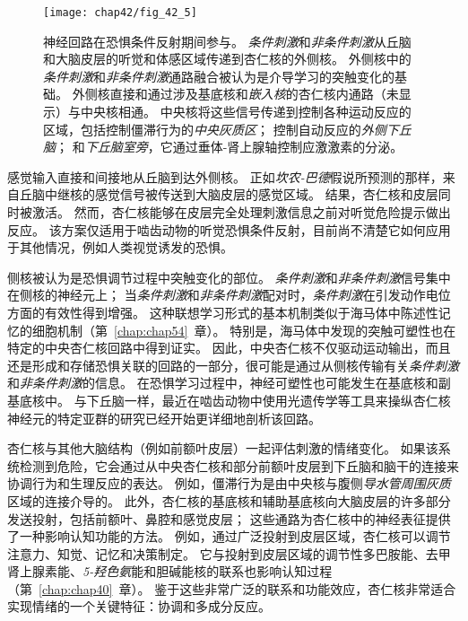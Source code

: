 \begin{figure}[htbp]
	\centering
	\texttt{[image: chap42/fig\_42\_5]}
	\caption{神经回路在恐惧条件反射期间参与。
		\textit{条件刺激}和\textit{\textit{非条件刺激}}从丘脑和大脑皮层的听觉和体感区域传递到杏仁核的外侧核。
		外侧核中的\textit{条件刺激}和\textit{非条件刺激}通路融合被认为是介导学习的突触变化的基础。
		外侧核直接和通过涉及基底核和\textit{嵌入核}的杏仁核内通路（未显示）与中央核相通。
		中央核将这些信号传递到控制各种运动反应的区域，包括控制僵滞行为的\textit{中央灰质区}；
		控制自动反应的\textit{外侧下丘脑}；
		和\textit{下丘脑室旁}，它通过垂体-肾上腺轴控制应激激素的分泌\cite{medina2002parallels}。}
	\label{fig:42_5}
\end{figure}


感觉输入直接和间接地从丘脑到达外侧核。
正如\textit{坎农-巴德}假说所预测的那样，来自丘脑中继核的感觉信号被传送到大脑皮层的感觉区域。
结果，杏仁核和皮层同时被激活。
然而，杏仁核能够在皮层完全处理刺激信息之前对听觉危险提示做出反应。
该方案仅适用于啮齿动物的听觉恐惧条件反射，目前尚不清楚它如何应用于其他情况，例如人类视觉诱发的恐惧。


侧核被认为是恐惧调节过程中突触变化的部位。
\textit{条件刺激}和\textit{非条件刺激}信号集中在侧核的神经元上；
当\textit{条件刺激}和\textit{非条件刺激}配对时，\textit{条件刺激}在引发动作电位方面的有效性得到增强。
这种联想学习形式的基本机制类似于海马体中陈述性记忆的细胞机制（第~\ref{chap:chap54}~章）。
特别是，海马体中发现的突触可塑性也在特定的中央杏仁核回路中得到证实。
因此，中央杏仁核不仅驱动运动输出，而且还是形成和存储恐惧关联的回路的一部分，很可能是通过从侧核传输有关\textit{条件刺激}和\textit{非条件刺激}的信息。
在恐惧学习过程中，神经可塑性也可能发生在基底核和副基底核中。
与下丘脑一样，最近在啮齿动物中使用光遗传学等工具来操纵杏仁核神经元的特定亚群的研究已经开始更详细地剖析该回路。


杏仁核与其他大脑结构（例如前额叶皮层）一起评估刺激的情绪变化。
如果该系统检测到危险，它会通过从中央杏仁核和部分前额叶皮层到下丘脑和脑干的连接来协调行为和生理反应的表达。
例如，僵滞行为是由中央核与腹侧\textit{导水管周围灰质}区域的连接介导的。
此外，杏仁核的基底核和辅助基底核向大脑皮层的许多部分发送投射，包括前额叶、鼻腔和感觉皮层；
这些通路为杏仁核中的神经表征提供了一种影响认知功能的方法。
例如，通过广泛投射到皮层区域，杏仁核可以调节注意力、知觉、记忆和决策制定。
它与投射到皮层区域的调节性多巴胺能、去甲肾上腺素能、\textit{5-羟色氨}能和胆碱能核的联系也影响认知过程（第~\ref{chap:chap40}~章）。
鉴于这些非常广泛的联系和功能效应，杏仁核非常适合实现情绪的一个关键特征：协调和多成分反应。



